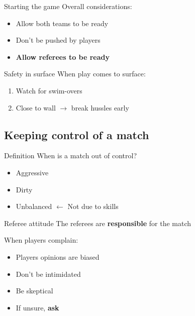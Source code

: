 \documentclass{beamer}
\begin{document}
    \begin{frame}{Starting the game}
        Overall considerations:
        \begin{itemize}
            \item Allow both teams to be ready
            \item Don't be pushed by players
            \item \textbf{Allow referees to be ready}
        \end{itemize}
    \end{frame}

    \begin{frame}{Safety in surface}
        When play comes to surface:
        \begin{enumerate}
            \item Watch for swim-overs
            \item Close to wall $\rightarrow$ break hussles early
        \end{enumerate}
    \end{frame}

    \subsection{Keeping control of a match}

    \begin{frame}{Definition}
        When is a match out of control?

        \pause

        \begin{itemize}
            \item Aggressive
            \item Dirty
            \item Unbalanced $\leftarrow$ Not due to skills
        \end{itemize}
    \end{frame}

    \begin{frame}{Referee attitude}
        The referees are \textbf{responsible} for the match

        When players complain:
        \begin{itemize}
            \item Players opinions are biased
            \item Don't be intimidated
            \item Be skeptical
            \item If unsure, \textbf{ask}
        \end{itemize}
    \end{frame}
\end{document}
